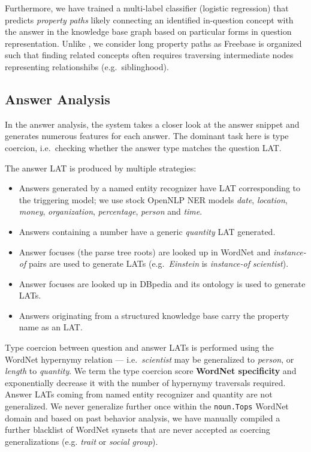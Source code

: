 Furthermore, we have trained a multi-label classifier (logistic regression)
that predicts \textit{property paths}
likely connecting an identified in-question concept with the answer in the knowledge base
graph based on particular forms in question representation. \cite{LeanFreebaseYao}
Unlike \cite{LeanFreebaseYao}, we consider long property paths as
Freebase is organized such that finding related concepts
often requires traversing intermediate nodes representing relationshibs (e.g.\ siblinghood).

\subsection{Answer Analysis}

In the answer analysis, the system takes a closer look at the answer snippet
and generates numerous features for each answer.
The dominant task here is type coercion,
i.e.\ checking whether the answer type matches the question LAT.

The answer LAT is produced by multiple strategies:
\begin{itemize}
	\item Answers generated by a named entity recognizer have LAT corresponding to the triggering model;
		we use stock OpenNLP NER models \textit{date}, \textit{location}, \textit{money}, \textit{organization}, \textit{percentage}, \textit{person} and \textit{time}.
	\item Answers containing a number have a generic \textit{quantity} LAT generated.
	\item Answer focuses (the parse tree roots) are looked up in WordNet and \textit{instance-of} pairs are used to generate LATs (e.g.\ \textit{Einstein} is \textit{instance-of} \textit{scientist}).
	\item Answer focuses are looked up in DBpedia and its ontology is used to generate LATs.
	\item Answers originating from a structured knowledge base carry the property name as an LAT.
\end{itemize}

Type coercion between question and answer LATs is performed using the WordNet
hypernymy relation --- i.e.\ \textit{scientist} may be generalized to \textit{person}, or \textit{length} to \textit{quantity}.
We term the type coercion score \textbf{WordNet specificity} and exponentially decrease it
with the number of hypernymy traversals required.
Answer LATs coming from named entity recognizer and quantity are not generalized.
We never generalize further once within the \texttt{noun.Tops} WordNet domain and
based on past behavior analysis, we have manually compiled a further blacklist
of WordNet synsets that are never accepted as coercing generalizations
(e.g. \textit{trait} or \textit{social group}).

